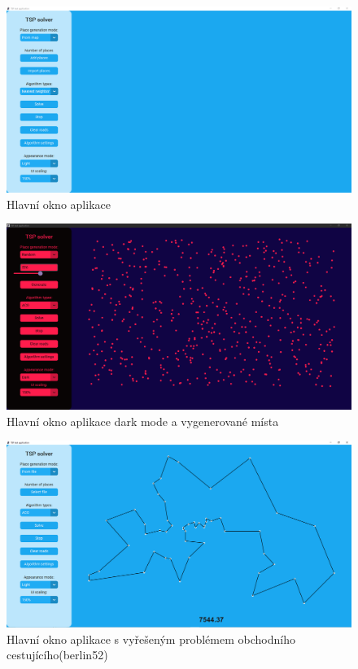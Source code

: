 \begin{figure}
    \centering
    \includegraphics[width=15cm]{obrazky-figures/main_window.png}
    \caption{Hlavní okno aplikace}
    \label{fig:main_window_basic}
\end{figure}
\begin{figure}
    \centering
    \includegraphics[width=15cm]{obrazky-figures/main_window_random_places_dark.png}
    \caption{Hlavní okno aplikace dark mode a vygenerované místa}
    \label{fig:main_window_dark_generated}
\end{figure}
\begin{figure}
    \centering
    \includegraphics[width=15cm]{obrazky-figures/main_window_solved_from_file.png}
    \caption{Hlavní okno aplikace s vyřešeným problémem obchodního cestujícího(berlin52)}
    \label{fig:main_window_dark_solved}
\end{figure}
